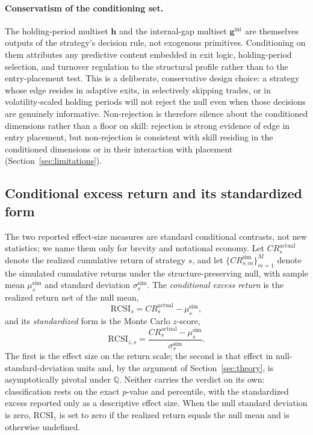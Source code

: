 \documentclass[risks,article,submit,pdftex,oneauthor]{Definitions/mdpi}
\begin{document}
\paragraph{Conservatism of the conditioning set.} The holding-period multiset $\mathbf{h}$ and the internal-gap multiset $\mathbf{g}^{\mathrm{int}}$ are themselves outputs of the strategy's decision rule, not exogenous primitives. Conditioning on them attributes any predictive content embedded in exit logic, holding-period selection, and turnover regulation to the structural profile rather than to the entry-placement test. This is a deliberate, conservative design choice: a strategy whose edge resides in adaptive exits, in selectively skipping trades, or in volatility-scaled holding periods will not reject the null even when those decisions are genuinely informative. Non-rejection is therefore silence about the conditioned dimensions rather than a floor on skill: rejection is strong evidence of edge in entry placement, but non-rejection is consistent with skill residing in the conditioned dimensions or in their interaction with placement (Section~\ref{sec:limitations}).

\subsection{Conditional excess return and its standardized form}

The two reported effect-size measures are standard conditional contrasts, not new statistics; we name them only for brevity and notational economy. Let \(CR_s^{\mathrm{actual}}\) denote the realized cumulative return of strategy \(s\), and let \(\{CR_{s,m}^{\mathrm{sim}}\}_{m=1}^{M}\) denote the simulated cumulative returns under the structure-preserving null, with sample mean \(\mu_s^{\mathrm{sim}}\) and standard deviation \(\sigma_s^{\mathrm{sim}}\). The \emph{conditional excess return} is the realized return net of the null mean,
\begin{equation}
\mathrm{RCSI}_s = CR_s^{\mathrm{actual}} - \mu_s^{\mathrm{sim}},
\end{equation}
and its \emph{standardized} form is the Monte Carlo $z$-score,
\begin{equation}
\mathrm{RCSI}_{z,s}=\frac{CR_s^{\mathrm{actual}}-\mu_s^{\mathrm{sim}}}{\sigma_s^{\mathrm{sim}}}.
\end{equation}
The first is the effect size on the return scale; the second is that effect in null-standard-deviation units and, by the argument of Section~\ref{sec:theory}, is asymptotically pivotal under $\mathbb{Q}$. Neither carries the verdict on its own: classification rests on the exact $p$-value and percentile, with the standardized excess reported only as a descriptive effect size. When the null standard deviation is zero, $\mathrm{RCSI}_z$ is set to zero if the realized return equals the null mean and is otherwise undefined.
\end{document}
